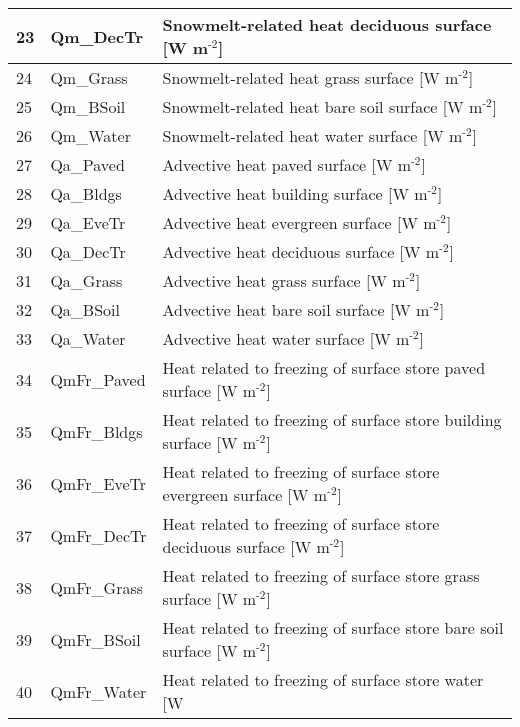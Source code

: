 \documentclass[letterpaper,10pt,english]{sphinxmanual}
\begin{document}
\begin{savenotes}
\begin{longtable}{|l|l|l|}
\hline
23
&
Qm\_DecTr
&
Snowmelt-related heat
\textendash{} deciduous surface
{[}W m$^{\text{-2}}${]}
\\
\hline
24
&
Qm\_Grass
&
Snowmelt-related heat
\textendash{} grass surface {[}W
m$^{\text{-2}}${]}
\\
\hline
25
&
Qm\_BSoil
&
Snowmelt-related heat
\textendash{} bare soil surface
{[}W m$^{\text{-2}}${]}
\\
\hline
26
&
Qm\_Water
&
Snowmelt-related heat
\textendash{} water surface {[}W
m$^{\text{-2}}${]}
\\
\hline
27
&
Qa\_Paved
&
Advective heat \textendash{}
paved surface {[}W
m$^{\text{-2}}${]}
\\
\hline
28
&
Qa\_Bldgs
&
Advective heat \textendash{}
building surface {[}W
m$^{\text{-2}}${]}
\\
\hline
29
&
Qa\_EveTr
&
Advective heat \textendash{}
evergreen surface {[}W
m$^{\text{-2}}${]}
\\
\hline
30
&
Qa\_DecTr
&
Advective heat \textendash{}
deciduous surface {[}W
m$^{\text{-2}}${]}
\\
\hline
31
&
Qa\_Grass
&
Advective heat \textendash{}
grass surface {[}W
m$^{\text{-2}}${]}
\\
\hline
32
&
Qa\_BSoil
&
Advective heat \textendash{} bare
soil surface {[}W
m$^{\text{-2}}${]}
\\
\hline
33
&
Qa\_Water
&
Advective heat \textendash{}
water surface {[}W
m$^{\text{-2}}${]}
\\
\hline
34
&
QmFr\_Paved
&
Heat related to
freezing of surface
store \textendash{} paved surface
{[}W m$^{\text{-2}}${]}
\\
\hline
35
&
QmFr\_Bldgs
&
Heat related to
freezing of surface
store \textendash{} building
surface {[}W
m$^{\text{-2}}${]}
\\
\hline
36
&
QmFr\_EveTr
&
Heat related to
freezing of surface
store \textendash{} evergreen
surface {[}W
m$^{\text{-2}}${]}
\\
\hline
37
&
QmFr\_DecTr
&
Heat related to
freezing of surface
store \textendash{} deciduous
surface {[}W
m$^{\text{-2}}${]}
\\
\hline
38
&
QmFr\_Grass
&
Heat related to
freezing of surface
store \textendash{} grass surface
{[}W m$^{\text{-2}}${]}
\\
\hline
39
&
QmFr\_BSoil
&
Heat related to
freezing of surface
store \textendash{} bare soil
surface {[}W
m$^{\text{-2}}${]}
\\
\hline
40
&
QmFr\_Water
&
Heat related to
freezing of surface
store \textendash{} water {[}W

\end{longtable}
\end{savenotes}
\end{document}
